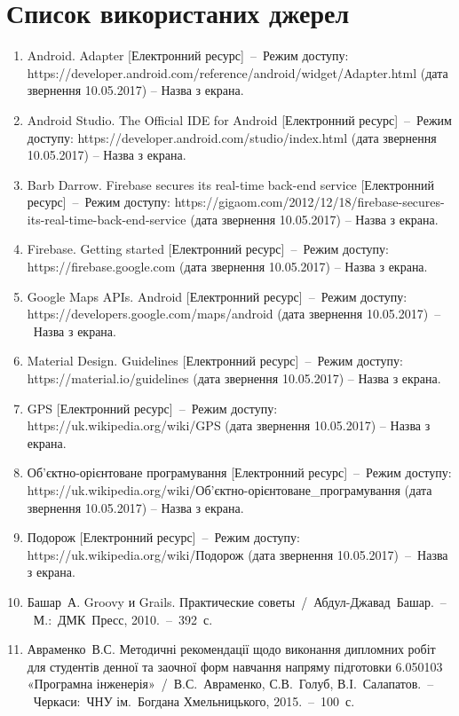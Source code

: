 \documentclass[../main.tex]{subfiles}
\begin{document}
\chapter*{Список використаних джерел}
	
\begin{enumerate}
	\item Android. Adapter [Електронний ресурс]~–~Режим доступу: https://developer.android.com/reference/android/widget/Adapter.html (дата звернення 10.05.2017) – Назва з екрана.
	\item Android Studio. The Official IDE for Android [Електронний ресурс]~–~Режим доступу: https://developer.android.com/studio/index.html (дата звернення 10.05.2017) – Назва з екрана.
	\item Barb Darrow. Firebase secures its real-time back-end service [Електронний ресурс]~–~Режим доступу: https://gigaom.com/2012/12/18/firebase-secures-its-real-time-back-end-service (дата звернення 10.05.2017) – Назва з екрана.
	\item Firebase. Getting started [Електронний ресурс]~–~Режим доступу: https://firebase.google.com (дата звернення 10.05.2017) – Назва з екрана.
	\item Google Maps APIs. Android [Електронний ресурс]~–~Режим доступу: https://developers.google.com/maps/android (дата звернення 10.05.2017)~–~Назва з екрана.
	\item Material Design. Guidelines [Електронний ресурс]~–~Режим доступу: https://material.io/guidelines (дата звернення 10.05.2017) – Назва з екрана.
	\item GPS [Електронний ресурс]~–~Режим доступу: https://uk.wikipedia.org/wiki/GPS (дата звернення 10.05.2017) – Назва з екрана.
	\item Об'єктно-орієнтоване програмування [Електронний ресурс]~–~Режим доступу: https://uk.wikipedia.org/wiki/Об'єктно-орієнтоване\_програмування (дата звернення 10.05.2017) – Назва з екрана.
	\item Подорож [Електронний ресурс]~–~Режим доступу: https://uk.wikipedia.org/wiki/Подорож (дата звернення 10.05.2017)~–~Назва з екрана.
	\item Башар~А. Groovy и Grails. Практические советы~/~Абдул-Джавад~Башар.~–~М.:~ДМК~Пресс, 2010.~–~392~с.
	\item Авраменко~В.С. Методичні рекомендації щодо виконання дипломних робіт для студентів денної та заочної форм навчання напряму підготовки 6.050103 «Програмна інженерія»~/~В.С.~Авраменко, С.В.~Голуб, В.І.~Салапатов.~–~Черкаси:~ЧНУ ім.~Богдана Хмельницького, 2015.~–~100~с.

\end{enumerate}
\end{document}
